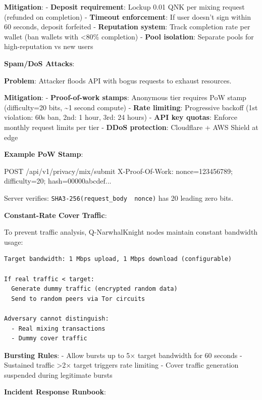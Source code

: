 \documentclass[
  11pt,
]{article}
\newenvironment{Shaded}{\begin{snugshade}}{\end{snugshade}}
\newcommand{\NormalTok}[1]{#1}
\begin{document}
\textbf{Mitigation}: - \textbf{Deposit requirement}: Lockup 0.01 QNK per
mixing request (refunded on completion) - \textbf{Timeout enforcement}:
If user doesn't sign within 60 seconds, deposit forfeited -
\textbf{Reputation system}: Track completion rate per wallet (ban
wallets with \textless80\% completion) - \textbf{Pool isolation}:
Separate pools for high-reputation vs new users

\textbf{Spam/DoS Attacks}:

\textbf{Problem}: Attacker floods API with bogus requests to exhaust
resources.

\textbf{Mitigation}: - \textbf{Proof-of-work stamps}: Anonymous tier
requires PoW stamp (difficulty=20 bits, \textasciitilde1 second compute)
- \textbf{Rate limiting}: Progressive backoff (1st violation: 60s ban,
2nd: 1 hour, 3rd: 24 hours) - \textbf{API key quotas}: Enforce monthly
request limits per tier - \textbf{DDoS protection}: Cloudflare + AWS
Shield at edge

\textbf{Example PoW Stamp}:

\begin{Shaded}
\begin{Highlighting}[]
\NormalTok{POST /api/v1/privacy/mix/submit}
\NormalTok{X{-}Proof{-}Of{-}Work: nonce=123456789; difficulty=20; hash=00000abcdef...}
\end{Highlighting}
\end{Shaded}

Server verifies:
\texttt{SHA3-256(request\_body\ \textbar{}\textbar{}\ nonce)} has 20
leading zero bits.

\textbf{Constant-Rate Cover Traffic}:

To prevent traffic analysis, Q-NarwhalKnight nodes maintain constant
bandwidth usage:

\begin{verbatim}
Target bandwidth: 1 Mbps upload, 1 Mbps download (configurable)

If real traffic < target:
  Generate dummy traffic (encrypted random data)
  Send to random peers via Tor circuits

Adversary cannot distinguish:
  - Real mixing transactions
  - Dummy cover traffic
\end{verbatim}

\textbf{Bursting Rules}: - Allow bursts up to 5× target bandwidth for 60
seconds - Sustained traffic \textgreater2× target triggers rate limiting
- Cover traffic generation suspended during legitimate bursts

\textbf{Incident Response Runbook}:
\end{document}
